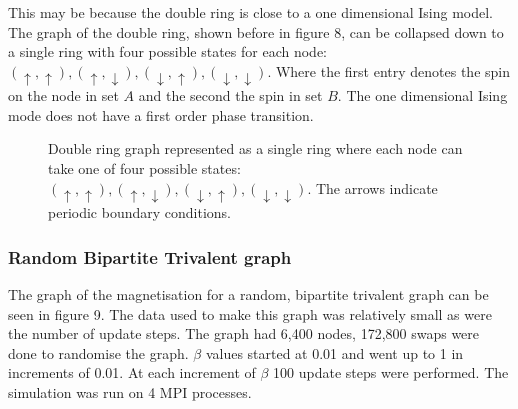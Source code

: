 \documentclass[pdftex,12pt,a4paper]{article}
\begin{document}
This may be because the double ring is close to a one dimensional Ising model. The graph of the double ring, shown before in figure 8, can be collapsed down to a single ring with four possible states for each node: $(\uparrow, \uparrow),(\uparrow, \downarrow),(\downarrow, \uparrow),(\downarrow, \downarrow)$. Where the first entry denotes the spin on the node in set $A$ and the second the spin in set $B$. The one dimensional Ising mode does not have a first order phase transition.

\begin{figure}
\begin{center}
\caption{Double ring graph represented as a single ring where each node can take one of four possible states: $(\uparrow, \uparrow),(\uparrow, \downarrow),(\downarrow, \uparrow),(\downarrow, \downarrow)$. The arrows indicate periodic boundary conditions.}
\end{center}
\end{figure}







\subsubsection{Random Bipartite Trivalent graph}

The graph of the magnetisation for a random, bipartite trivalent graph can be seen in figure 9. The data used to make this graph was relatively small as were the number of update steps. The graph had 6,400 nodes, 172,800 swaps were done to randomise the graph. $\beta$ values started at 0.01 and went up to 1 in increments of 0.01. At each increment of $\beta$ 100 update steps were performed. The simulation was run on 4 MPI processes.
\end{document}
